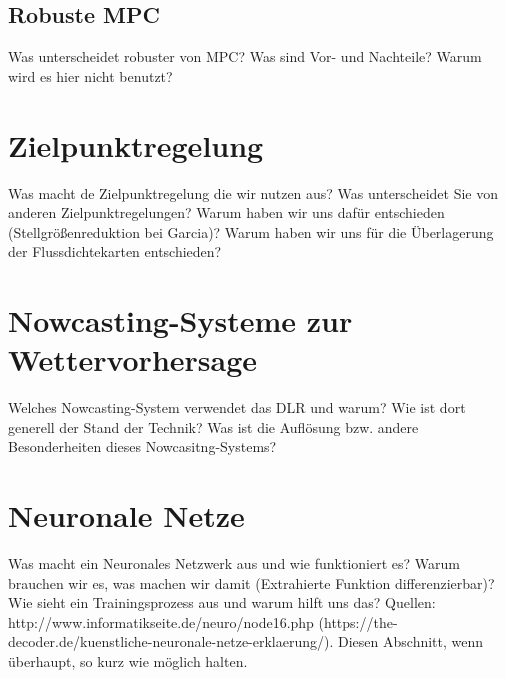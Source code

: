 \subsection{Robuste MPC} \label{subsec_RobusteMPC}
Was unterscheidet robuster von  MPC? Was sind Vor- und Nachteile?
Warum wird es hier nicht benutzt?

\section{Zielpunktregelung} \label{sec_Zielpunktregelung}
Was macht de Zielpunktregelung die wir nutzen aus?
Was unterscheidet Sie von anderen Zielpunktregelungen?
Warum haben wir uns dafür entschieden (Stellgrößenreduktion bei Garcia)?
Warum haben wir uns für die Überlagerung der Flussdichtekarten entschieden?

\section{Nowcasting-Systeme zur Wettervorhersage} \label{sec_Nowcasting}
Welches Nowcasting-System verwendet das DLR und warum?
Wie ist dort generell der Stand der Technik?
Was ist die Auflösung bzw. andere Besonderheiten dieses Nowcasitng-Systems?

\section{Neuronale Netze} \label{sec_NN}
Was macht ein Neuronales Netzwerk aus und wie funktioniert es?
Warum brauchen wir es, was machen wir damit (Extrahierte Funktion differenzierbar)?
Wie sieht ein Trainingsprozess aus und warum hilft uns das?
Quellen: http://www.informatikseite.de/neuro/node16.php (https://the-decoder.de/kuenstliche-neuronale-netze-erklaerung/).
Diesen Abschnitt, wenn überhaupt, so kurz wie möglich halten.

